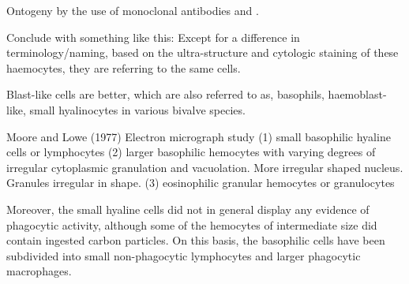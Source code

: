 Ontogeny by the use of monoclonal antibodies \cite{Noel1994} and \cite{Dyrynda1997}.

Conclude with something like this:
Except for a difference in terminology/naming, based on the ultra-structure and cytologic staining of these haemocytes, they are referring to the same cells. 


\begin{table}[ht!]
	\centering
	\caption{Classification of hemocyte subpopulations in \emph{Mytilus edluis}.}
	\label{tb:hemocyte_classification}
\end{table}

Blast-like cells are better, which are also referred to as, basophils, haemoblast-like, small hyalinocytes in various bivalve species.

Moore and Lowe (1977) Electron micrograph study
(1) small basophilic hyaline cells or lymphocytes
(2) larger basophilic hemocytes with varying degrees of irregular cytoplasmic granulation and vacuolation. More irregular shaped nucleus. Granules irregular in shape.
(3) eosinophilic granular hemocytes or granulocytes

Moreover, the small hyaline cells did not in general display any evidence of phagocytic activity, although some of the hemocytes of intermediate size did contain ingested carbon particles. On this basis, the basophilic cells have been subdivided into small non-phagocytic lymphocytes and larger phagocytic macrophages. 

